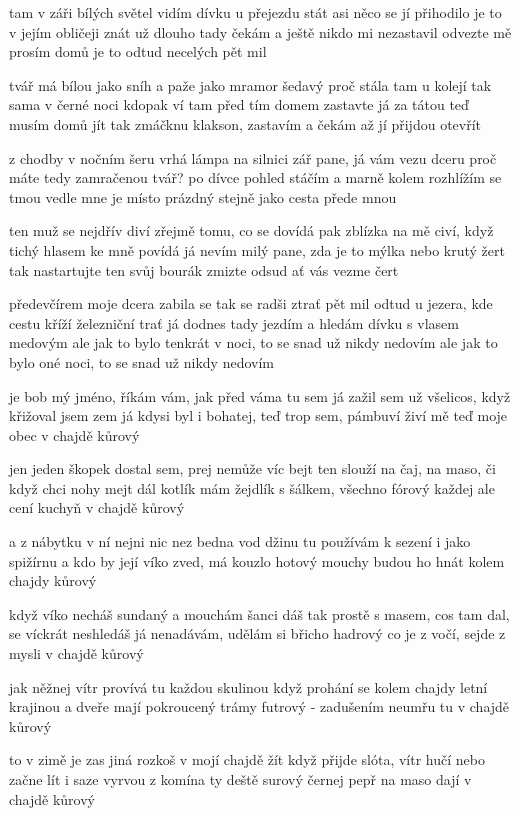 tam  v záři bílých světel vidím dívku u přejezdu stát
asi něco se jí přihodilo je to v jejím obličeji znát
už dlouho tady čekám a ještě nikdo mi nezastavil
odvezte mě prosím domů je to odtud necelých pět mil \s

tvář má bílou jako sníh a paže jako mramor šedavý
proč stála tam u kolejí tak sama v černé noci kdopak ví
tam před tím domem zastavte já za tátou teď musím domů jít
tak zmáčknu klakson, zastavím a čekám až jí přijdou otevřít \s

z chodby v nočním šeru vrhá lámpa na silnici zář
pane, já vám vezu dceru proč máte tedy zamračenou tvář?
po dívce pohled stáčím a marně kolem rozhlížím se tmou
vedle mne je místo prázdný stejně jako cesta přede mnou \s

ten muž se nejdřív diví zřejmě tomu, co se dovídá
pak zblízka na mě civí, když tichý hlasem ke mně povídá
já nevím milý pane, zda je to mýlka nebo krutý žert
tak nastartujte ten svůj bourák zmizte odsud ať vás vezme čert \s

předevčírem moje dcera zabila se tak se radši ztrať
pět mil odtud u jezera, kde cestu kříží železniční trať
já dodnes tady jezdím a hledám dívku s vlasem medovým
ale jak to bylo tenkrát v noci, to se snad už nikdy nedovím
ale jak to bylo oné noci, to se snad už nikdy nedovím




je bob mý jméno, říkám vám, jak před váma tu sem
já zažil sem už všelicos, když křižoval jsem zem
já kdysi byl i bohatej, teď trop sem, pámbuví
živí mě teď moje obec v chajdě kůrový \s

jen jeden škopek dostal sem, prej nemůže víc bejt
ten slouží na čaj, na maso, či když chci nohy mejt
dál kotlík mám žejdlík s šálkem, všechno fórový
každej ale cení kuchyň v chajdě kůrový \s

a z nábytku v ní nejni nic nez bedna vod džinu
tu používám k sezení i jako spižírnu
a kdo by její víko zved, má kouzlo hotový
mouchy budou ho hnát kolem chajdy kůrový \s

když víko necháš sundaný a mouchám šanci dáš
tak prostě s masem, cos tam dal, se víckrát neshledáš
já nenadávám, udělám si břicho hadrový
co je z vočí, sejde z mysli v chajdě kůrový \s

jak něžnej vítr provívá tu každou skulinou
když prohání se kolem chajdy letní krajinou
a dveře mají pokroucený trámy futrový -
zadušením neumřu tu v chajdě kůrový \s

to v zimě je zas jiná rozkoš v mojí chajdě žít
když přijde slóta, vítr hučí nebo začne lít
i saze vyrvou z komína ty deště surový
černej pepř na maso dají v chajdě kůrový \s


